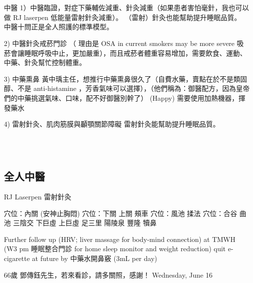 \documentclass[aspectratio=169]{beamer}
\begin{document}
\begin{frame}
~~\\
~~\\
中醫
1）中醫臨證，對症下藥輔佐減重、針灸減重（如果患者害怕毫針，我也可以做 RJ laserpen 低能量雷射針灸減重）。
（雷射）針灸也能幫助提升睡眠品質。
中醫十問正是全人照護的標準模型。

2) 中醫針灸戒菸門診 （ 理由是 OSA in current smokers may be more severe 吸菸會讓睡眠呼吸中止，更加嚴重），而且戒菸者體重容易增加，需要飲食、運動、中藥、針灸幫忙控制體重。

3) 中藥熏鼻
黃中瑀主任，想推行中藥熏鼻很久了（自費水藥，賣點在於不是類固醇、不是 anti-histamine ，芳香氣味可以選擇），（他們稱為：御醫配方，因為皇帝們的中藥挑選氣味、口味，配不好御醫別幹了） (Happy)
需要使用加熱機器，揮發藥水

4) 雷射針灸、肌肉筋膜與顳顎關節障礙
雷射針灸能幫助提升睡眠品質。

~~\\
~~\\
\end{frame}

\subsection{全人中醫}%

\begin{frame}
    \begin{outline}
\1 RJ Laserpen 雷射針灸

\2 穴位：內關 (安神止胸悶)
\2 穴位：下關 上關 頰車 
\2 穴位：風池 揉法 
\2 穴位：合谷 曲池 三陰交 下巨虛 上巨虛 足三里 陽陵泉 豐隆 犢鼻 

\1 Further follow up (HRV; liver massage for body-mind connection) at TMWH (W3 pm 睡眠整合門診 for home sleep 
\2 monitor and weight reduction)
\2 quit e-cigarette at future by 中藥水開鼻竅 (3mL per day)
    \end{outline}


\end{frame}

\begin{frame}
66歲 鄧傳鈺先生，若來看診，請多關照，感謝！
Wednesday, June 16
\end{frame}
\end{document}
